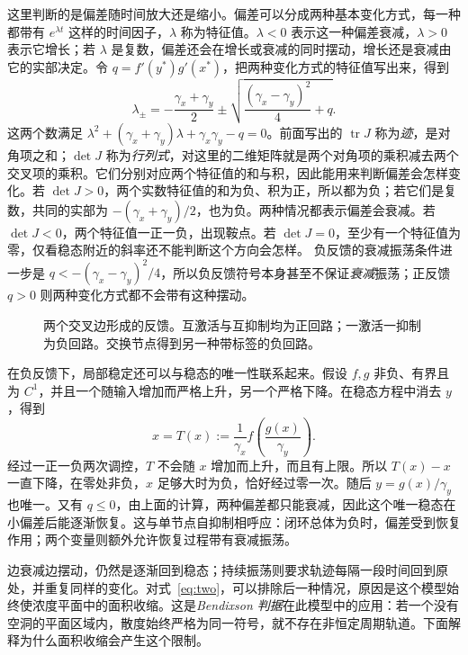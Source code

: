 这里判断的是偏差随时间放大还是缩小。偏差可以分成两种基本变化方式，每一种都带有 $e^{\lambda t}$ 这样的时间因子，$\lambda$ 称为特征值。$\lambda<0$ 表示这一种偏差衰减，$\lambda>0$ 表示它增长；若 $\lambda$ 是复数，偏差还会在增长或衰减的同时摆动，增长还是衰减由它的实部决定。令 $q=f'(y^*)g'(x^*)$，把两种变化方式的特征值写出来，得到
\[
\lambda_{\pm}=-\frac{\gamma_x+\gamma_y}{2}
\pm\sqrt{\frac{(\gamma_x-\gamma_y)^2}{4}+q}.
\]
这两个数满足 $\lambda^2+(\gamma_x+\gamma_y)\lambda+\gamma_x\gamma_y-q=0$。前面写出的 $\operatorname{tr}J$ 称为\emph{迹}，是对角项之和；$\det J$ 称为\emph{行列式}，对这里的二维矩阵就是两个对角项的乘积减去两个交叉项的乘积。它们分别对应两个特征值的和与积，因此能用来判断偏差会怎样变化。若 $\det J>0$，两个实数特征值的和为负、积为正，所以都为负；若它们是复数，共同的实部为 $-(\gamma_x+\gamma_y)/2$，也为负。两种情况都表示偏差会衰减。若 $\det J<0$，两个特征值一正一负，出现鞍点。若 $\det J=0$，至少有一个特征值为零，仅看稳态附近的斜率还不能判断这个方向会怎样。
负反馈的衰减振荡条件进一步是
$q<-(\gamma_x-\gamma_y)^2/4$，所以负反馈符号本身甚至不保证\emph{衰减}振荡；正反馈 $q>0$ 则两种变化方式都不会带有这种摆动。
\begin{figure}[H]\centering
{}
\caption{两个交叉边形成的反馈。互激活与互抑制均为正回路；一激活一抑制为负回路。交换节点得到另一种带标签的负回路。}
\end{figure}

在负反馈下，局部稳定还可以与稳态的唯一性联系起来。假设 $f,g$ 非负、有界且为 $C^1$，并且一个随输入增加而严格上升，另一个严格下降。在稳态方程中消去 $y$，得到
\[
x=T(x):=\frac1{\gamma_x}f\!\left(\frac{g(x)}{\gamma_y}\right).
\]
经过一正一负两次调控，$T$ 不会随 $x$ 增加而上升，而且有上限。所以 $T(x)-x$ 一直下降，在零处非负，$x$ 足够大时为负，恰好经过零一次。随后 $y=g(x)/\gamma_y$ 也唯一。又有 $q\leq0$，由上面的计算，两种偏差都只能衰减，因此这个唯一稳态在小偏差后能逐渐恢复。这与单节点自抑制相呼应：闭环总体为负时，偏差受到恢复作用；两个变量则额外允许恢复过程带有衰减振荡。


边衰减边摆动，仍然是逐渐回到稳态；持续振荡则要求轨迹每隔一段时间回到原处，并重复同样的变化。对式~\eqref{eq:two}，可以排除后一种情况，原因是这个模型始终使浓度平面中的面积收缩。这是\emph{Bendixson 判据}在此模型中的应用：若一个没有空洞的平面区域内，散度始终严格为同一符号，就不存在非恒定周期轨道。下面解释为什么面积收缩会产生这个限制。

